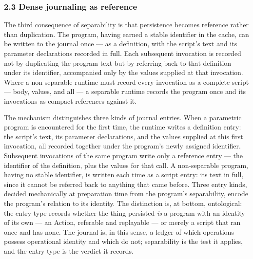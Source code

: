 \documentclass[
]{article}
\newcounter{none} %
\begin{document}
\subsubsection{2.3 Dense journaling as
reference}\label{dense-journaling-as-reference}

The third consequence of separability is that persistence becomes
reference rather than duplication. The program, having earned a stable
identifier in the cache, can be written to the journal once --- as a
definition, with the script's text and its parameter declarations
recorded in full. Each subsequent invocation is recorded not by
duplicating the program text but by referring back to that definition
under its identifier, accompanied only by the values supplied at that
invocation. Where a non-separable runtime must record every invocation
as a complete script --- body, values, and all --- a separable runtime
records the program once and its invocations as compact references
against it.

The mechanism distinguishes three kinds of journal entries. When a
parametric program is encountered for the first time, the runtime writes
a definition entry: the script's text, its parameter declarations, and
the values supplied at this first invocation, all recorded together
under the program's newly assigned identifier. Subsequent invocations of
the same program write only a reference entry --- the identifier of the
definition, plus the values for that call. A non-separable program,
having no stable identifier, is written each time as a script entry: its
text in full, since it cannot be referred back to anything that came
before. Three entry kinds, decided mechanically at preparation time from
the program's separability, encode the program's relation to its
identity. The distinction is, at bottom, ontological: the entry type
records whether the thing persisted \emph{is} a program with an identity
of its own --- an Action, referable and replayable --- or merely a
script that ran once and has none. The journal is, in this sense, a
ledger of which operations possess operational identity and which do
not; separability is the test it applies, and the entry type is the
verdict it records.
\end{document}
